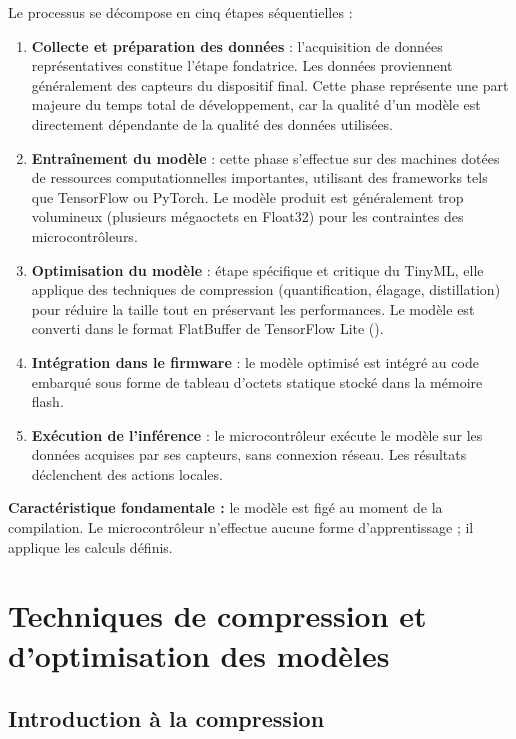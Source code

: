Le processus se décompose en cinq étapes séquentielles :
\begin{enumerate}
  \item \textbf{Collecte et préparation des données} : l'acquisition de données
        représentatives constitue l'étape fondatrice. Les données proviennent
        généralement des capteurs du dispositif final. Cette phase représente
        une part majeure du temps total de développement, car la qualité d'un
        modèle est directement dépendante de la qualité des données utilisées.
  \item \textbf{Entraînement du modèle} : cette phase s'effectue sur des
        machines dotées de ressources computationnelles importantes, utilisant
        des frameworks tels que TensorFlow ou PyTorch. Le modèle produit est
        généralement trop volumineux (plusieurs mégaoctets en Float32) pour les
        contraintes des microcontrôleurs.
  \item \textbf{Optimisation du modèle} : étape spécifique et critique du
        TinyML, elle applique des techniques de compression (quantification,
        élagage, distillation) pour réduire la taille tout en préservant les
        performances. Le modèle est converti dans le format FlatBuffer de
        TensorFlow Lite ().
  \item \textbf{Intégration dans le firmware} : le modèle optimisé est intégré
        au code embarqué sous forme de tableau d'octets statique stocké dans la
        mémoire flash.
  \item \textbf{Exécution de l'inférence} : le microcontrôleur exécute le modèle
        sur les données acquises par ses capteurs, sans connexion réseau. Les
        résultats déclenchent des actions locales.
\end{enumerate}

\textbf{Caractéristique fondamentale :} le modèle est figé au moment de la
compilation. Le microcontrôleur n'effectue aucune forme d'apprentissage ; il
applique les calculs définis.

\section{Techniques de compression et d'optimisation des modèles}

\subsection{Introduction à la compression}

